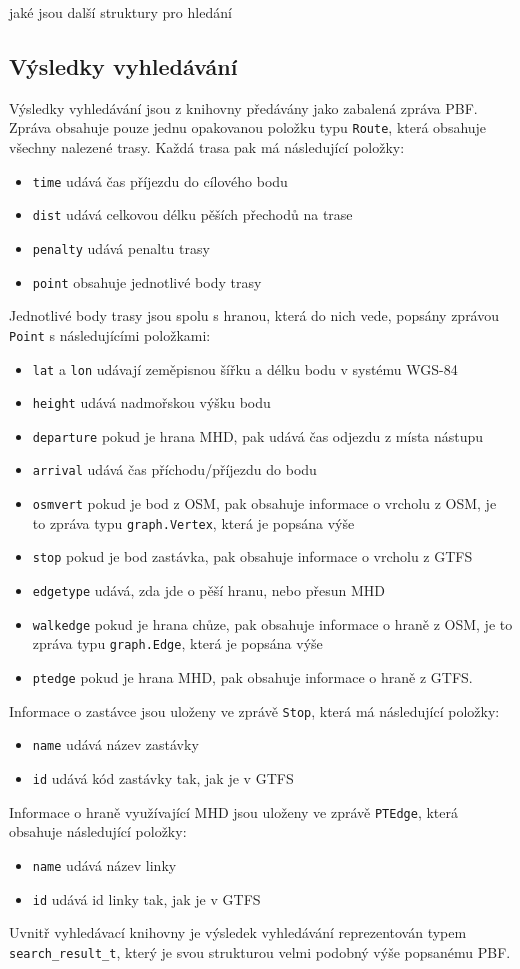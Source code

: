 \TODO jaké jsou další struktury pro hledání

\subsection{Výsledky vyhledávání}
Výsledky vyhledávání jsou z knihovny předávány jako zabalená zpráva PBF. Zpráva
obsahuje pouze jednu opakovanou položku typu {\tt Route}, která obsahuje všechny
nalezené trasy. Každá trasa pak má následující položky: 
\begin{itemize}
	\item {\tt time} udává čas příjezdu do cílového bodu
	\item {\tt dist} udává celkovou délku pěších přechodů na trase
	\item {\tt penalty} udává penaltu trasy
	\item {\tt point} obsahuje jednotlivé body trasy
\end{itemize}
Jednotlivé body trasy jsou spolu s hranou, která do nich vede, popsány zprávou
{\tt Point} s následujícími položkami: 
\begin{itemize}
	\item {\tt lat} a {\tt lon} udávají zeměpisnou šířku a délku bodu v
	systému WGS-84
	\item {\tt height} udává nadmořskou výšku bodu
	\item {\tt departure} pokud je hrana MHD, pak udává čas odjezdu z místa
	nástupu
	\item {\tt arrival} udává čas příchodu/příjezdu do bodu 
	\item {\tt osmvert} pokud je bod z OSM, pak obsahuje informace o vrcholu
	z OSM, je to zpráva typu {\tt graph.Vertex}, která je popsána výše
	\item {\tt stop} pokud je bod zastávka, pak obsahuje informace o vrcholu z GTFS
	\item {\tt edgetype} udává, zda jde o pěší hranu, nebo přesun MHD
	\item {\tt walkedge} pokud je hrana chůze, pak obsahuje informace o
	hraně z OSM, je to zpráva typu {\tt graph.Edge}, která je popsána výše
	\item {\tt ptedge} pokud je hrana MHD, pak obsahuje informace o hraně z
	GTFS.
\end{itemize}
Informace o zastávce jsou uloženy ve zprávě {\tt Stop}, která má následující
položky:
\begin{itemize}
	\item {\tt name} udává název zastávky
	\item {\tt id} udává kód zastávky tak, jak je v GTFS
\end{itemize}
Informace o hraně využívající MHD jsou uloženy ve zprávě {\tt PTEdge}, která
obsahuje následující položky:
\begin{itemize}
	\item {\tt name} udává název linky
	\item {\tt id} udává id linky tak, jak je v GTFS
\end{itemize}
Uvnitř vyhledávací knihovny je výsledek vyhledávání reprezentován typem {\tt
search\_result\_t}, který je svou strukturou velmi podobný výše popsanému PBF.


